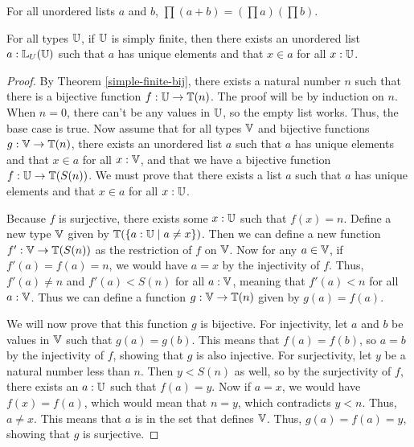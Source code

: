 \documentclass[../math.tex]{subfiles}
\begin{document}
\begin{theorem} \label{ulist-prod-conc}
    For all unordered lists $a$ and $b$, $\prod (a + b) = (\prod a) (\prod b)$.
\end{theorem}

\begin{theorem} \label{ulist-finite}
    For all types $\mathbb{U}$, if $\mathbb{U}$ is simply finite, then there exists an unordered
    list $a : \mathbb{L}_U(\mathbb{U})$ such that $a$ has unique elements and that $x \in a$ for
    all $x : \mathbb{U}$.
\end{theorem}
\begin{proof}
    By Theorem \ref{simple-finite-bij}, there exists a natural number $n$ such
    that there is a bijective function $f : \mathbb{U} \to \mathbb{T}(n)$.  The proof will be by
    induction on $n$.  When $n = 0$, there can't be any values in $\mathbb{U}$, so the
    empty list works.  Thus, the base case is true.  Now assume that for all
    types $\mathbb{V}$ and bijective functions $g : \mathbb{V} \to \mathbb{T}(n)$, there exists an
    unordered list $a$ such that $a$ has unique elements and that $x \in a$ for
    all $x : \mathbb{V}$, and that we have a bijective function $f : \mathbb{U} \to \mathbb{T}(S(n))$.
    We must prove that there exists a list $a$ such that $a$ has unique elements
    and that $x \in a$ for all $x : \mathbb{U}$.

    Because $f$ is surjective, there exists some $x : \mathbb{U}$ such that $f(x) = n$.
    Define a new type $\mathbb{V}$ given by $\mathbb{T}(\{a : \mathbb{U} \mid a \neq x\})$.  Then we can
    define a new function $f' : \mathbb{V} \to \mathbb{T}(S(n))$ as the restriction of $f$ on
    $\mathbb{V}$.  Now for any $a \in \mathbb{V}$, if $f'(a) = f(a) = n$, we would have $a = x$
    by the injectivity of $f$.  Thus, $f'(a) \neq n$ and $f'(a) < S(n)$ for all
    $a : \mathbb{V}$, meaning that $f'(a) < n$ for all $a : \mathbb{V}$.  Thus we can define a
    function $g : \mathbb{V} \to \mathbb{T}(n)$ given by $g(a) = f(a)$.

    We will now prove that this function $g$ is bijective.  For injectivity, let
    $a$ and $b$ be values in $\mathbb{V}$ such that $g(a) = g(b)$.  This means that
    $f(a) = f(b)$, so $a = b$ by the injectivity of $f$, showing that $g$ is
    also injective.  For surjectivity, let $y$ be a natural number less than
    $n$.  Then $y < S(n)$ as well, so by the surjectivity of $f$, there exists
    an $a : \mathbb{U}$ such that $f(a) = y$.  Now if $a = x$, we would have $f(x) =
    f(a)$, which would mean that $n = y$, which contradicts $y < n$.  Thus, $a
    \neq x$.  This means that $a$ is in the set that defines $\mathbb{V}$.  Thus, $g(a)
    = f(a) = y$, showing that $g$ is surjective.


\end{proof}
\end{document}
